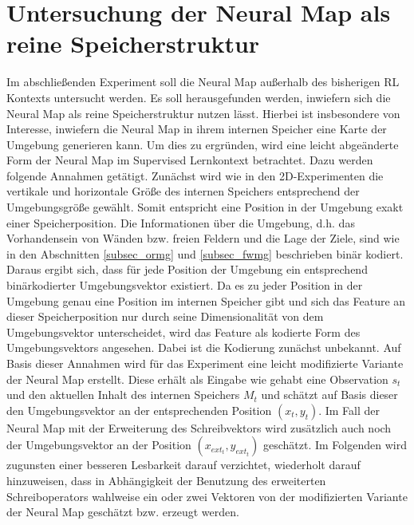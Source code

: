 \section{Untersuchung der Neural Map als reine Speicherstruktur}
\label{sec_mem_test}

Im abschließenden Experiment soll die Neural Map außerhalb des bisherigen RL Kontexts untersucht werden. Es soll herausgefunden werden, inwiefern sich die Neural Map als reine Speicherstruktur nutzen lässt. Hierbei ist insbesondere von Interesse, inwiefern die Neural Map in ihrem internen Speicher eine Karte der Umgebung generieren kann. Um dies zu ergründen, wird eine leicht abgeänderte Form der Neural Map im Supervised Lernkontext betrachtet. Dazu werden folgende Annahmen getätigt. Zunächst wird wie in den 2D-Experimenten die vertikale und horizontale Größe des internen Speichers entsprechend der Umgebungsgröße gewählt. Somit entspricht eine Position in der Umgebung exakt einer Speicherposition. Die Informationen über die Umgebung, d.h. das Vorhandensein von Wänden bzw. freien Feldern und die Lage der Ziele, sind wie in den Abschnitten \ref{subsec_ormg} und \ref{subsec_fwmg} beschrieben binär kodiert. Daraus ergibt sich, dass für jede Position der Umgebung ein entsprechend binärkodierter Umgebungsvektor existiert. Da es zu jeder Position in der Umgebung genau eine Position im internen Speicher gibt und sich das Feature an dieser Speicherposition nur durch seine Dimensionalität von dem Umgebungsvektor unterscheidet, wird das Feature als kodierte Form des Umgebungsvektors angesehen. Dabei ist die Kodierung zunächst unbekannt. Auf Basis dieser Annahmen wird für das Experiment eine leicht modifizierte Variante der Neural Map erstellt. Diese erhält als Eingabe wie gehabt eine Observation $s_t$ und den aktuellen Inhalt des internen Speichers $M_t$ und schätzt auf Basis dieser den Umgebungsvektor an der entsprechenden Position $(x_t, y_t)$. Im Fall der Neural Map mit der Erweiterung des Schreibvektors wird zusätzlich auch noch der Umgebungsvektor an der Position $(x_{ext_t},y_{ext_t})$ geschätzt. Im Folgenden wird zugunsten einer besseren Lesbarkeit darauf verzichtet, wiederholt darauf hinzuweisen, dass in Abhängigkeit der Benutzung des erweiterten Schreiboperators wahlweise ein oder zwei Vektoren von der modifizierten Variante der Neural Map geschätzt bzw. erzeugt werden.

